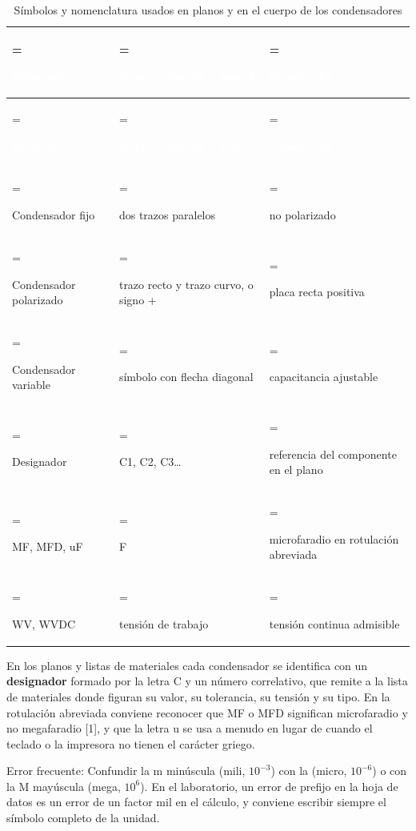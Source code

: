 \documentclass[11pt,letterpaper]{article}
\begin{document}
\begin{xltabular}{\linewidth}{>{\hsize\linewidth=\hsize\raggedright\arraybackslash}X>{\hsize\linewidth=\hsize\raggedright\arraybackslash}X>{\hsize\linewidth=\hsize\raggedright\arraybackslash}X}
\caption{Símbolos y nomenclatura usados en planos y en el cuerpo de los condensadores} \\
 \textcolor{white}{\textbf{Elemento}} & \textcolor{white}{\textbf{Representación o marca}} & \textcolor{white}{\textbf{Significado}} \\
\endfirsthead
{} \textcolor{white}{\textbf{Elemento}} & \textcolor{white}{\textbf{Representación o marca}} & \textcolor{white}{\textbf{Significado}} \\
\endhead
\bottomrule
\endlastfoot
  Condensador fijo & dos trazos paralelos & no polarizado \\
   Condensador polarizado & trazo recto y trazo curvo, o signo + & placa recta positiva \\
  Condensador variable & símbolo con flecha diagonal & capacitancia ajustable \\
   Designador & C1, C2, C3\ldots{} & referencia del componente en el plano \\
  MF, MFD, uF & \textmu{}F & microfaradio en rotulación abreviada \\
   WV, WVDC & tensión de trabajo & tensión continua admisible \\
\end{xltabular}

En los planos y listas de materiales cada condensador se identifica con un \textbf{designador} formado por la letra C y un número correlativo, que remite a la lista de materiales donde figuran su valor, su tolerancia, su tensión y su tipo. En la rotulación abreviada conviene reconocer que MF o MFD significan microfaradio y no megafaradio [1], y que la letra u se usa a menudo en lugar de \textmu{} cuando el teclado o la impresora no tienen el carácter griego.

\begin{nota}{Error frecuente:}
Confundir la \guillemotleft{}m\guillemotright{} minúscula (mili, $10^{-3}$) con la \guillemotleft{}\textmu{}\guillemotright{} (micro, $10^{-6}$) o con la \guillemotleft{}M\guillemotright{} mayúscula (mega, $10^{6}$). En el laboratorio, un error de prefijo en la hoja de datos es un error de un factor mil en el cálculo, y conviene escribir siempre el símbolo completo de la unidad.
\end{nota}
\end{document}
